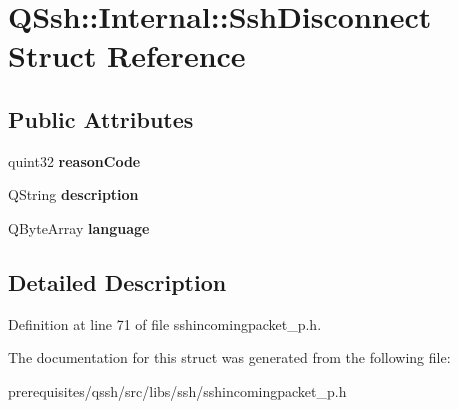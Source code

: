 \hypertarget{struct_q_ssh_1_1_internal_1_1_ssh_disconnect}{}\section{Q\+Ssh\+:\+:Internal\+:\+:Ssh\+Disconnect Struct Reference}
\label{struct_q_ssh_1_1_internal_1_1_ssh_disconnect}
\subsection*{Public Attributes}
\begin{DoxyCompactItemize}
\item 
\mbox{\label{struct_q_ssh_1_1_internal_1_1_ssh_disconnect_a583ce9a90f9559f601e666c3e11902da}} 
quint32 {\bfseries reason\+Code}
\item 
\mbox{\label{struct_q_ssh_1_1_internal_1_1_ssh_disconnect_a086d83a1b6bf7beab77693c6be42522c}} 
Q\+String {\bfseries description}
\item 
\mbox{\label{struct_q_ssh_1_1_internal_1_1_ssh_disconnect_a30d6537e17f09d89dfdd5f0d2d8580a5}} 
Q\+Byte\+Array {\bfseries language}
\end{DoxyCompactItemize}


\subsection{Detailed Description}


Definition at line 71 of file sshincomingpacket\+\_\+p.\+h.



The documentation for this struct was generated from the following file\+:\begin{DoxyCompactItemize}
\item 
prerequisites/qssh/src/libs/ssh/sshincomingpacket\+\_\+p.\+h\end{DoxyCompactItemize}

